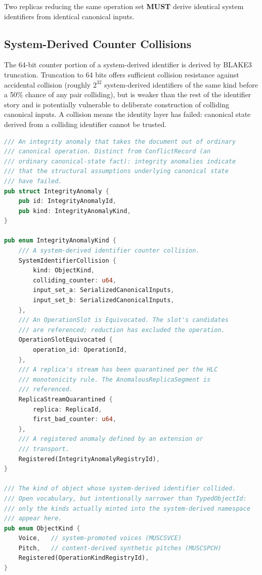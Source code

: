 \documentclass[11pt,letterpaper]{report}
\newcounter{requirement}[chapter]
\newcommand{\MUST}{\textbf{MUST}}
\begin{document}
\begin{requirement}
  Two replicas reducing the same operation set \MUST{} derive
  identical system identifiers from identical canonical inputs.
\end{requirement}

\subsection{System-Derived Counter Collisions}
\label{sec:graph:system-collisions}

The 64-bit counter portion of a system-derived identifier is
derived by BLAKE3 truncation. Truncation to 64 bits offers
sufficient collision resistance against accidental collision
(roughly $2^{32}$ system-derived identifiers of the same kind
before a 50\% chance of any pair colliding), but is weaker than
the rest of the identifier story and is potentially vulnerable
to deliberate construction of colliding canonical inputs. A
collision means the identity layer has failed: canonical state
derived from a colliding identifier cannot be trusted.

\begin{lstlisting}[language=Rust]
/// An integrity anomaly that takes the document out of ordinary
/// canonical operation. Distinct from ConflictRecord (an
/// ordinary canonical-state fact): integrity anomalies indicate
/// that the structural assumptions underlying canonical state
/// have failed.
pub struct IntegrityAnomaly {
    pub id: IntegrityAnomalyId,
    pub kind: IntegrityAnomalyKind,
}

pub enum IntegrityAnomalyKind {
    /// A system-derived identifier counter collision.
    SystemIdentifierCollision {
        kind: ObjectKind,
        colliding_counter: u64,
        input_set_a: SerializedCanonicalInputs,
        input_set_b: SerializedCanonicalInputs,
    },
    /// An OperationSlot is Equivocated. The slot's candidates
    /// are referenced; reduction has excluded the operation.
    OperationSlotEquivocated {
        operation_id: OperationId,
    },
    /// A replica's stream has been quarantined per the HLC
    /// monotonicity rule. The AnomalousReplicaSegment is
    /// referenced.
    ReplicaStreamQuarantined {
        replica: ReplicaId,
        first_bad_counter: u64,
    },
    /// A registered anomaly defined by an extension or
    /// transport.
    Registered(IntegrityAnomalyRegistryId),
}

/// The kind of object whose system-derived identifier collided.
/// Open vocabulary, but intentionally narrower than TypedObjectId:
/// only the kinds actually minted into the system-derived namespace
/// appear here.
pub enum ObjectKind {
    Voice,   // system-promoted voices (MUSCSVCE)
    Pitch,   // content-derived synthetic pitches (MUSCSPCH)
    Registered(OperationKindRegistryId),
}
\end{lstlisting}
\end{document}
